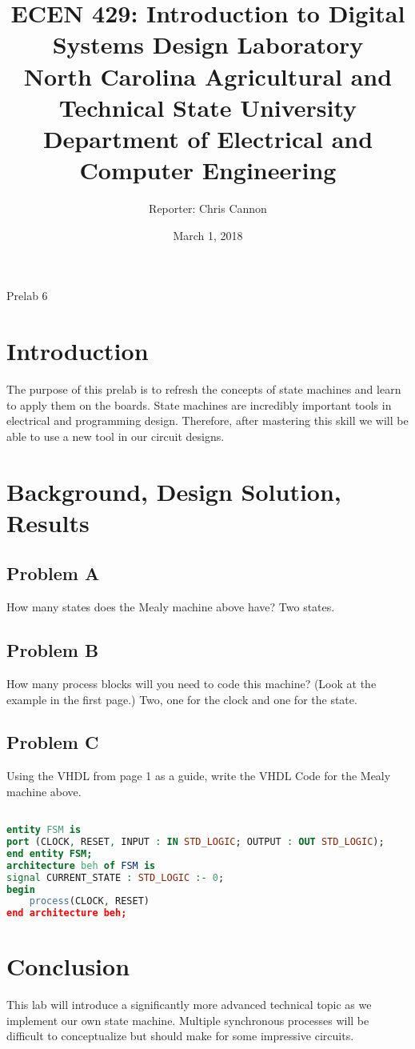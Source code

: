\documentclass[11pt]{article}
\title {{\titleFont ECEN 429: Introduction to Digital Systems Design Laboratory \\ North Carolina Agricultural and Technical State University \\ Department of Electrical and Computer Engineering}} %
\author{\titleFont Reporter: Chris Cannon} %
\date{\titleFont March 1, 2018}
\begin{document}
\begin{titlingpage}
\maketitle
\begin{center}
	Prelab 6
\end{center}
\end{titlingpage}

\section{Introduction}
The purpose of this prelab is to refresh the concepts of state machines and learn to apply them on the boards. State machines are incredibly important tools in electrical and programming design. Therefore, after mastering this skill we will be able to use a new tool in our circuit designs.

\section{Background, Design Solution, Results}
\subsection{Problem A}
How many states does the Mealy machine above have?
Two states.

\subsection{Problem B}
How many process blocks will you need to code this machine? (Look at the example in the first page.)
Two, one for the clock and one for the state.

\subsection{Problem C}
Using the VHDL from page 1 as a guide, write the VHDL Code for the Mealy machine above.

\begin{lstlisting}[language=VHDL]

entity FSM is 
port (CLOCK, RESET, INPUT : IN STD_LOGIC; OUTPUT : OUT STD_LOGIC); 
end entity FSM; 
architecture beh of FSM is 
signal CURRENT_STATE : STD_LOGIC :- 0;
begin 
	process(CLOCK, RESET)
end architecture beh;	

\end{lstlisting}

\section{Conclusion}
This lab will introduce a significantly more advanced technical topic as we implement our own state machine. Multiple synchronous processes will be difficult to conceptualize but should make for some impressive circuits.
\end{document}
